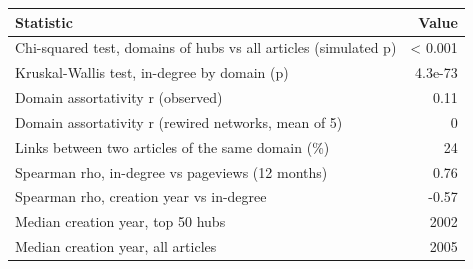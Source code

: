 
\begin{tabular}{lr}
\toprule
Statistic & Value\\
\midrule
Chi-squared test, domains of hubs vs all articles (simulated p) & < 0.001\\
Kruskal-Wallis test, in-degree by domain (p) & 4.3e-73\\
Domain assortativity r (observed) & 0.11\\
Domain assortativity r (rewired networks, mean of 5) & 0\\
Links between two articles of the same domain (\%) & 24\\
Spearman rho, in-degree vs pageviews (12 months) & 0.76\\
Spearman rho, creation year vs in-degree & -0.57\\
Median creation year, top 50 hubs & 2002\\
Median creation year, all articles & 2005\\
\bottomrule
\end{tabular}
